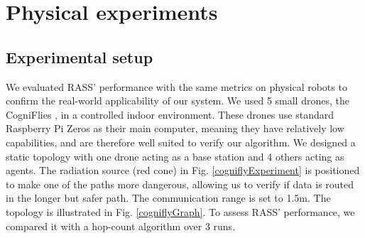 \section{Physical experiments}
\label{Physical experiments}

\subsection{Experimental setup}
We evaluated \ac{RASS}' performance with the same
metrics on physical robots to confirm the real-world applicability of our system. We used 5 small drones, the CogniFlies \cite{de2021flexible}, in a controlled indoor environment. These drones use standard Raspberry Pi Zeros as their main computer, meaning they have relatively low capabilities, and are therefore well suited to verify our algorithm. We designed a static topology with one drone acting as a base station and 4 others acting as agents. The radiation source (red cone) in Fig. \ref{cogniflyExperiment} is positioned to make one of the paths more dangerous, allowing us to verify if data is routed in the longer but safer path. The communication range is set to 1.5m. The topology is illustrated in Fig. \ref{cogniflyGraph}. To assess \ac{RASS}' performance, we compared it with a hop-count algorithm over 3 runs.

